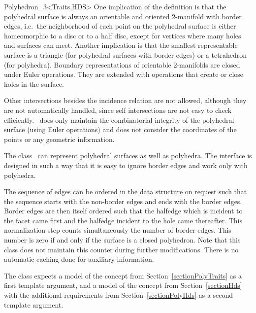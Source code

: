 \begin{ccClassTemplate}{Polyhedron_3<Traits,HDS>}
One implication of the definition is that the polyhedral surface is
always an orientable and oriented 2-manifold with border edges,
i.e.~the neighborhood of each point on the polyhedral surface is
either homeomorphic to a disc or to a half disc, except for vertices
where many holes and surfaces can meet. Another implication is that
the smallest representable surface is a triangle (for polyhedral
surfaces with border edges) or a tetrahedron (for polyhedra). Boundary
representations of orientable 2-manifolds are closed under Euler
operations. They are extended with operations that create or close
holes in the surface.

Other intersections besides the incidence relation are not allowed,
although they are not automatically handled, since self intersections
are not easy to check efficiently. \ccClassTemplateName\ does only
maintain the combinatorial integrity of the polyhedral surface (using
Euler operations) and does not consider the coordinates of the points
or any geometric information.

The class \ccClassTemplateName\ can represent polyhedral surfaces as
well as polyhedra. The interface is designed in such a way that it
is easy to ignore border edges and work only with polyhedra.

The sequence of edges can be ordered in the data structure on request
such that the sequence starts with the non-border edges and ends with
the border edges. Border edges are then itself ordered such that the
halfedge which is incident to the facet came first and the halfedge
incident to the hole came thereafter. This normalization step counts
simultaneously the number of border edges. This number is zero if and
only if the surface is a closed polyhedron. Note that this class does
not maintain this counter during further modifications. There is no
automatic caching done for auxiliary information.

The class  expects a model of the
 concept from Section~\ref{sectionPolyTraits}
as a first template argument, and a model of the
 concept from Section~\ref{sectionHds}
with the additional requirements from Section~\ref{sectionPolyHds} as a second
template argument.



\ccTypes



\end{ccClassTemplate}
